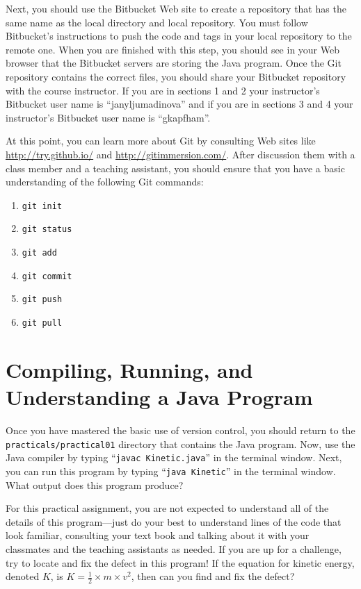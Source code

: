 Next, you should use the Bitbucket Web site to create a repository that has the same name as the local directory and
local repository.  You must follow Bitbucket's instructions to push the code and tags in your local repository to the
remote one. When you are finished with this step, you should see in your Web browser that the Bitbucket servers are
storing the Java program. Once the Git repository contains the correct files, you should share your Bitbucket repository
with the course instructor. If you are in sections 1 and 2 your instructor's Bitbucket user name is ``janyljumadinova'' and if you are in sections 3 and 4 your instructor's Bitbucket user name is ``gkapfham''.

At this point, you can learn more about Git by consulting Web sites like \url{http://try.github.io/} and
\url{http://gitimmersion.com/}.  After discussion them with a class member and a teaching assistant, you should ensure
that you have a basic understanding of the following Git commands:

\vspace*{-.125in}
\begin{enumerate} 
  \item {\tt git init}
  \item {\tt git status}
  \item {\tt git add} 
  \item {\tt git commit}
  \item {\tt git push}
  \item {\tt git pull} 
\end{enumerate}
\vspace*{-.125in}

\section*{Compiling, Running, and Understanding a Java Program}

Once you have mastered the basic use of version control, you should return to the \\ {\tt practicals/practical01}
directory that contains the Java program. Now, use the Java compiler by typing ``{\tt javac Kinetic.java}'' in the
terminal window.  Next, you can run this program by typing ``{\tt java Kinetic}'' in the terminal window.  What output
does this program produce?  

For this practical assignment, you are not expected to understand all of the details of this program---just do your best
to understand lines of the code that look familiar, consulting your text book and talking about it with your classmates
and the teaching assistants as needed. If you are up for a challenge, try to locate and fix the defect in this program!
If the equation for kinetic energy, denoted $K$, is $K=\frac{1}{2} \times m \times v^2$, then can you find and fix the
defect?

